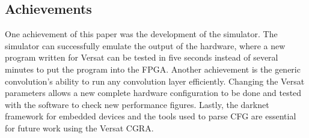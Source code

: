 \documentclass[conference]{IEEEtran}
\begin{document}
\subsection{Achievements}
\label{section:achievements}

One achievement of this paper was the development of the simulator. The simulator can successfully emulate the output of the hardware, where a new program written for Versat
can be tested in five seconds instead of several minutes to put the program into the FPGA.
Another achievement is the generic convolution's ability to run any convolution layer
efficiently. Changing the Versat parameters allows a new complete hardware configuration to be
done and tested with the software to check new performance figures.
Lastly, the darknet framework for embedded devices and the tools used to parse CFG
are essential for future work using the Versat CGRA.







	
	
	

\end{document}
